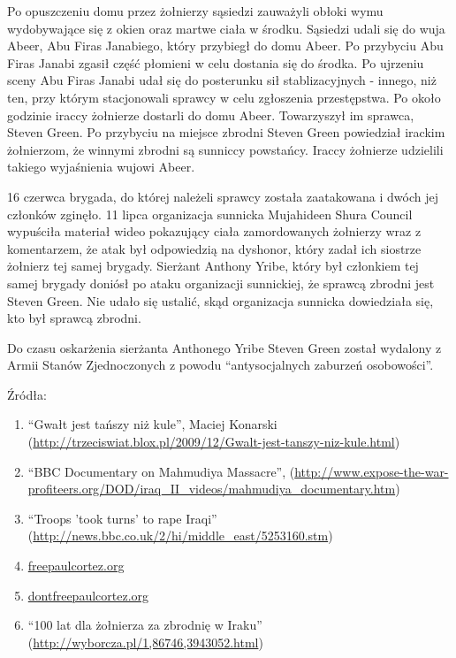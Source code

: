 \documentclass[12pt,a4paper]{article}
\begin{document}
Po opuszczeniu domu przez żołnierzy sąsiedzi zauważyli obłoki wymu
wydobywające się z okien oraz martwe ciała w środku. Sąsiedzi udali
się do wuja Abeer, Abu Firas Janabiego, który przybiegł do domu Abeer.
Po przybyciu Abu Firas Janabi zgasił część płomieni w celu dostania
się do środka. Po ujrzeniu sceny Abu Firas Janabi udał się do
posterunku sił stablizacyjnych - innego, niż ten, przy którym
stacjonowali sprawcy w celu zgłoszenia przestępstwa. Po około godzinie
iraccy żołnierze dostarli do domu Abeer. Towarzyszył im sprawca,
Steven Green. Po przybyciu na miejsce zbrodni Steven Green powiedział irackim
żołnierzom, że winnymi zbrodni są sunniccy powstańcy. Iraccy żołnierze
udzielili takiego wyjaśnienia wujowi Abeer.

16 czerwca brygada, do której należeli sprawcy została zaatakowana i
dwóch jej członków zginęło. 11 lipca organizacja sunnicka Mujahideen
Shura Council wypuściła materiał wideo pokazujący ciała zamordowanych żołnierzy
wraz z komentarzem, że atak był odpowiedzią na dyshonor, który zadał
ich siostrze żołnierz tej samej brygady. Sierżant Anthony Yribe, który
był członkiem tej samej brygady doniósł po ataku organizacji sunnickiej, że sprawcą zbrodni
jest Steven Green. Nie udało się ustalić, skąd organizacja sunnicka
dowiedziała się, kto był sprawcą zbrodni.


Do czasu oskarżenia sierżanta Anthonego Yribe Steven Green został
wydalony z Armii Stanów Zjednoczonych z powodu ``antysocjalnych
zaburzeń osobowości''. 

Źródła:
\begin{enumerate}
\item ``Gwałt jest tańszy niż kule'', Maciej Konarski (\url{http://trzeciswiat.blox.pl/2009/12/Gwalt-jest-tanszy-niz-kule.html})
\item ``BBC Documentary on Mahmudiya Massacre'',
  (\url{http://www.expose-the-war-profiteers.org/DOD/iraq_II_videos/mahmudiya_documentary.htm})
\item ``Troops 'took turns' to rape Iraqi'' (\url{http://news.bbc.co.uk/2/hi/middle_east/5253160.stm})
\item \url{freepaulcortez.org}
\item \url{dontfreepaulcortez.org}
\item ``100 lat dla żołnierza za zbrodnię w Iraku'' (\url{http://wyborcza.pl/1,86746,3943052.html})
\end{enumerate}
\end{document}
